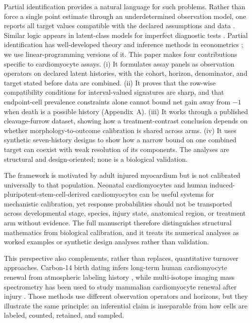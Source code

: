 \documentclass[11pt]{article}
\begin{document}
Partial identification provides a natural language for such problems. Rather than force a single point estimate through an underdetermined observation model, one reports all target values compatible with the declared assumptions and data \citep{Manski2003,ImbensManski2004}. Similar logic appears in latent-class models for imperfect diagnostic tests \citep{Collins2014}. Partial identification has well-developed theory and inference methods in econometrics \citep{Tamer2010,Stoye2009,KaidoMolinariStoye2019}; we use linear-programming versions of it. This paper makes four contributions specific to cardiomyocyte assays. (i) It formulates assay panels as observation operators on declared latent histories, with the cohort, horizon, denominator, and target stated before data are combined. (ii) It proves that the row-wise compatibility conditions for interval-valued signatures are sharp, and that endpoint-cell prevalence constraints alone cannot bound net gain away from $-1$ when death is a possible history (Appendix~A). (iii) It works through a published cleavage-furrow dataset, showing how a treatment-contrast conclusion depends on whether morphology-to-outcome calibration is shared across arms. (iv) It uses synthetic seven-history designs to show how a narrow bound on one combined target can coexist with weak resolution of its components. The analyses are structural and design-oriented; none is a biological validation.

The framework is motivated by adult injured myocardium but is not calibrated universally to that population. Neonatal cardiomyocytes and human induced-pluripotent-stem-cell-derived cardiomyocytes can be useful systems for mechanistic calibration, yet response probabilities should not be transported across developmental stage, species, injury state, anatomical region, or treatment arm without evidence. The full manuscript therefore distinguishes structural mathematics from biological calibration, and it treats its numerical analyses as worked examples or synthetic design analyses rather than validation.

This perspective also complements, rather than replaces, quantitative turnover approaches. Carbon-14 birth dating infers long-term human cardiomyocyte renewal from atmospheric labeling history \citep{Bergmann2009}, while multi-isotope imaging mass spectrometry has been used to study mammalian cardiomyocyte renewal after injury \citep{Senyo2013}. Those methods use different observation operators and horizons, but they illustrate the same principle: an inferential claim is inseparable from how cells are labeled, counted, retained, and sampled.
\end{document}
